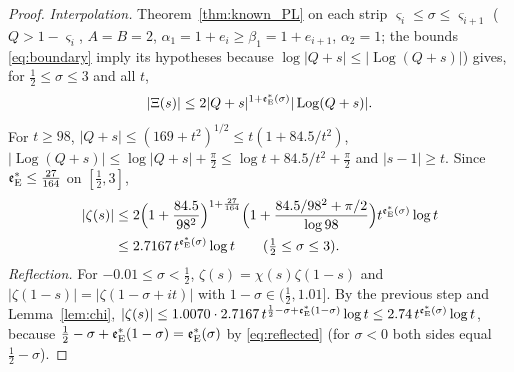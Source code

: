 \documentclass[11pt,a4paper]{article}
\makeatletter
\numberwithin{equation}{section}
\DeclareRobustCommand{\CGref}[1]{\ref{#1}}
\DeclareRobustCommand{\CGeqref}[1]{\eqref{#1}}
\let\CG@origref\ref
\let\CG@origeqref\eqref
\newcommand{\CG@gettip}[1]{\@ifundefined{CGTip@#1}{#1}{\csname CGTip@#1\endcsname}}
\DeclareRobustCommand{\CGref}[1]{\pdftooltip{\CG@origref{#1}}{\CG@gettip{#1}}}
\DeclareRobustCommand{\CGeqref}[1]{\pdftooltip{\CG@origeqref{#1}}{\CG@gettip{#1}}}
\theoremstyle{definition}
\theoremstyle{remark}
\newcommand{\eE}{\mathfrak e_{\rm E}}
\makeatother
\begin{document}
\begin{proof}
\emph{Interpolation.} Theorem~\CGref{thm:known_PL} on each strip $\varsigma_i\le\sigma\le\varsigma_{i+1}$ ($Q>1-\varsigma_i$, $A=B=2$, $\alpha_1=1+e_i\ge\beta_1=1+e_{i+1}$, $\alpha_2=1$; the bounds \CGeqref{eq:boundary} imply its hypotheses because $\log|Q+s|\le|\operatorname{Log}(Q+s)|$) gives, for $\frac12\le\sigma\le3$ and all $t$,
\[
|\Xi(s)|\le2|Q+s|^{1+\eE^*(\sigma)}|\operatorname{Log}(Q+s)| .
\]
For $t\ge98$, $|Q+s|\le(169+t^2)^{1/2}\le t(1+84.5/t^2)$, $|\operatorname{Log}(Q+s)|\le\log|Q+s|+\frac\pi2\le\log t+84.5/t^2+\frac\pi2$ and $|s-1|\ge t$. Since $\eE^*\le\frac{27}{164}$ on $[\frac12,3]$,
\begin{equation}
\begin{split}
|\zeta(s)|&\le2\Bigl(1+\frac{84.5}{98^2}\Bigr)^{1+\frac{27}{164}}\Bigl(1+\frac{84.5/98^2+\pi/2}{\log98}\Bigr)t^{\eE^*(\sigma)}\log t\\
&\le2.7167\,t^{\eE^*(\sigma)}\log t\qquad(\tfrac12\le\sigma\le3).
\end{split}
\label{eq:right_profile}
\end{equation}
\emph{Reflection.} For $-0.01\le\sigma<\frac12$, $\zeta(s)=\chi(s)\zeta(1-s)$ and $|\zeta(1-s)|=|\zeta(1-\sigma+it)|$ with $1-\sigma\in(\frac12,1.01]$. By the previous step and Lemma~\CGref{lem:chi},
$|\zeta(s)|\le1.0070\cdot2.7167\,t^{\frac12-\sigma+\eE^*(1-\sigma)}\log t\le2.74\,t^{\eE^*(\sigma)}\log t$, because $\frac12-\sigma+\eE^*(1-\sigma)=\eE^*(\sigma)$ by \CGeqref{eq:reflected} (for $\sigma<0$ both sides equal $\frac12-\sigma$).
\end{proof}
\end{document}
